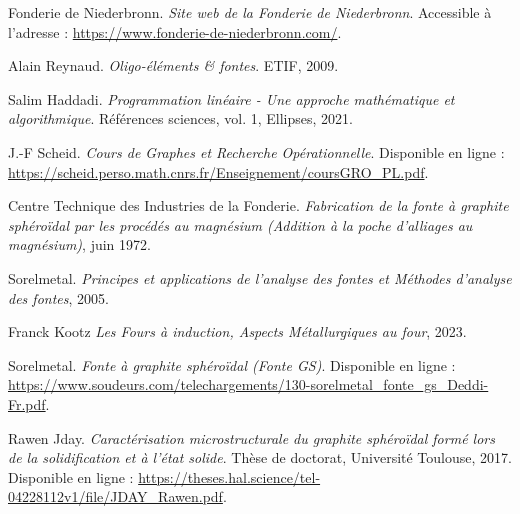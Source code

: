 \documentclass[12pt]{article}
\begin{document}
\begin{thebibliography}{9}

Fonderie de Niederbronn. \emph{Site web de la Fonderie de Niederbronn}. Accessible à l'adresse : \url{https://www.fonderie-de-niederbronn.com/}.

Alain Reynaud. \emph{Oligo-éléments \& fontes}. ETIF, 2009.

Salim Haddadi. \emph{Programmation linéaire - Une approche mathématique et algorithmique}. Références sciences, vol. 1, Ellipses, 2021.

J.-F Scheid. \emph{Cours de Graphes et Recherche Opérationnelle}. Disponible en ligne : \url{https://scheid.perso.math.cnrs.fr/Enseignement/coursGRO_PL.pdf}.

Centre Technique des Industries de la Fonderie. \emph{Fabrication de la fonte à graphite sphéroïdal par les procédés au magnésium (Addition à la poche d'alliages au magnésium)}, juin 1972.

Sorelmetal. \emph{Principes et applications de l'analyse des fontes et Méthodes d'analyse des fontes}, 2005.


Franck Kootz \emph{Les Fours à induction, Aspects Métallurgiques au four}, 2023.


Sorelmetal. \emph{Fonte à graphite sphéroïdal (Fonte GS)}. Disponible en ligne : \url{https://www.soudeurs.com/telechargements/130-sorelmetal_fonte_gs_Deddi-Fr.pdf}.


Rawen Jday. \emph{Caractérisation microstructurale du graphite sphéroïdal formé lors de la
solidification et à l'état solide}. Thèse de doctorat, Université Toulouse, 2017. Disponible en ligne : \url{https://theses.hal.science/tel-04228112v1/file/JDAY_Rawen.pdf}.

\end{thebibliography}
\end{document}
